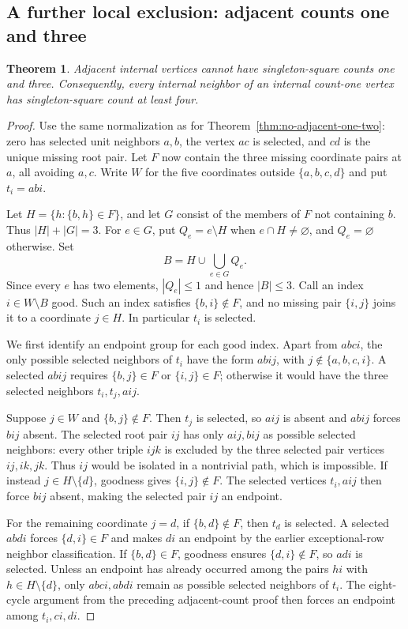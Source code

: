 \documentclass[11pt,a4paper]{article}
\newtheorem{theorem}{Theorem}[section]
\theoremstyle{definition}
\theoremstyle{remark}
\begin{document}
\subsection{A further local exclusion: adjacent counts one and three}
\begin{theorem}\label{thm:no-adjacent-one-three}
Adjacent internal vertices cannot have singleton-square counts one and three. Consequently, every internal neighbor of an internal count-one vertex has singleton-square count at least four.
\end{theorem}
\begin{proof}
Use the same normalization as for Theorem~\ref{thm:no-adjacent-one-two}: zero has selected unit neighbors $a,b$, the vertex $ac$ is selected, and $cd$ is the unique missing root pair. Let $F$ now contain the three missing coordinate pairs at $a$, all avoiding $a,c$. Write $W$ for the five coordinates outside $\{a,b,c,d\}$ and put $t_i=abi$.

Let $H=\{h:\{b,h\}\in F\}$, and let $G$ consist of the members of $F$ not containing $b$. Thus $|H|+|G|=3$. For $e\in G$, put $Q_e=e\setminus H$ when $e\cap H\ne\varnothing$, and $Q_e=\varnothing$ otherwise. Set
\[
B=H\cup\bigcup_{e\in G}Q_e.
\]
Since every $e$ has two elements, $|Q_e|\le1$ and hence $|B|\le3$. Call an index $i\in W\setminus B$ good. Such an index satisfies $\{b,i\}\notin F$, and no missing pair $\{i,j\}$ joins it to a coordinate $j\in H$. In particular $t_i$ is selected.

We first identify an endpoint group for each good index. Apart from $abci$, the only possible selected neighbors of $t_i$ have the form $abij$, with $j\notin\{a,b,c,i\}$. A selected $abij$ requires $\{b,j\}\in F$ or $\{i,j\}\in F$; otherwise it would have the three selected neighbors $t_i,t_j,aij$.

Suppose $j\in W$ and $\{b,j\}\notin F$. Then $t_j$ is selected, so $aij$ is absent and $abij$ forces $bij$ absent. The selected root pair $ij$ has only $aij,bij$ as possible selected neighbors: every other triple $ijk$ is excluded by the three selected pair vertices $ij,ik,jk$. Thus $ij$ would be isolated in a nontrivial path, which is impossible. If instead $j\in H\setminus\{d\}$, goodness gives $\{i,j\}\notin F$. The selected vertices $t_i,aij$ then force $bij$ absent, making the selected pair $ij$ an endpoint.

For the remaining coordinate $j=d$, if $\{b,d\}\notin F$, then $t_d$ is selected. A selected $abdi$ forces $\{d,i\}\in F$ and makes $di$ an endpoint by the earlier exceptional-row neighbor classification. If $\{b,d\}\in F$, goodness ensures $\{d,i\}\notin F$, so $adi$ is selected. Unless an endpoint has already occurred among the pairs $hi$ with $h\in H\setminus\{d\}$, only $abci,abdi$ remain as possible selected neighbors of $t_i$. The eight-cycle argument from the preceding adjacent-count proof then forces an endpoint among $t_i,ci,di$.


\end{proof}
\end{document}
